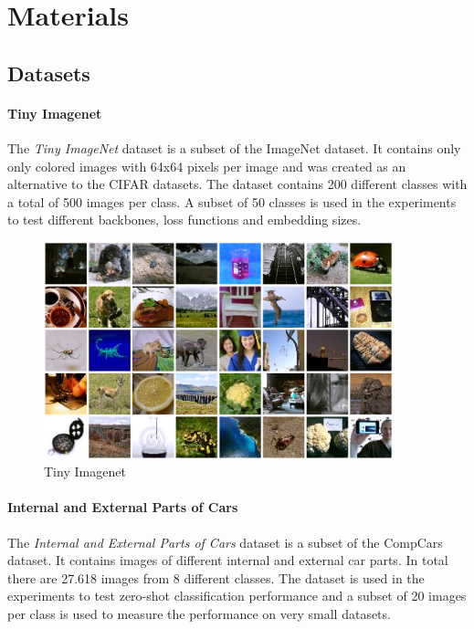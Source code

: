\documentclass[12pt,a4paper]{report}
\begin{document}
\newpage
\chapter{Materials}

\section{Datasets}

\subsubsection{Tiny Imagenet}
The  \textit{Tiny ImageNet} dataset is a subset of the ImageNet dataset.
It contains only only colored images with 64x64 pixels per image and was created as an alternative to the CIFAR \cite{cifar} datasets.
The dataset contains 200 different classes with a total of 500 images per class.\cite{tinyimagenet}
A subset of 50 classes is used in the experiments to test different backbones, loss functions and embedding sizes.

\begin{figure}[h]
    \centering
    \includegraphics[width=0.9\textwidth]{./images/tinyimagenet.png}
	\caption{Tiny Imagenet}
\end{figure}

\newpage

\subsubsection{Internal and External Parts of Cars}
The \textit{Internal and External Parts of Cars} dataset \cite{internalexternal} is a subset of the CompCars \cite{carparts} dataset.
It contains images of different internal and external car parts.
In total there are 27.618 images from 8 different classes.
The dataset is used in the experiments to test zero-shot classification performance and a subset of 20 images per class is used to measure the performance on very small datasets.
\end{document}
